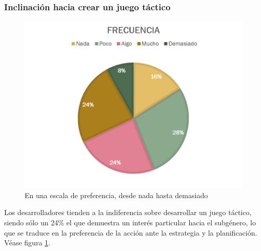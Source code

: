\documentclass[]{article}
\begin{document}
\subsubsection{Inclinaci\'on hacia crear un juego t\'actico}
\begin{figure}[H]
	
	\centering
	\includegraphics[width=1\textwidth]{Encuesta_tipo_tactico}
	\caption{En una escala de preferencia, desde nada hasta demasiado} 
	\label{TACTICO}
	
\end{figure}
Los desarrolladores tienden a la indiferencia sobre desarrollar un juego t\'actico, siendo s\'olo un 24\% el que demuestra un inter\'es particular hacia el subg\'enero, lo que se traduce en la preferencia de la acci\'on ante la estrategia y la planificaci\'on. V\'ease figura \ref{TACTICO}.
\end{document}
